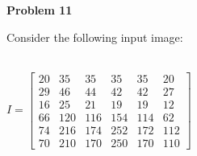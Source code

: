 \documentclass{article}
\begin{document}
\newpage
\noindent \textbf{Problem 11}

\noindent Consider the following input image: \\ \\
\begin{center}  

 $ I = \begin{bmatrix}
    20 & 35 & 35 & 35 &35 & 20 \\
    29 & 46 & 44 & 42 &42 & 27 \\
    16 & 25 & 21 & 19 &19 & 12 \\
    66 & 120 & 116 & 154 &114 & 62 \\
    74 & 216 & 174 & 252 &172 & 112 \\
    70 & 210 & 170 & 250 &170 & 110
  \end{bmatrix}$ 
\end{center}
\end{document}
